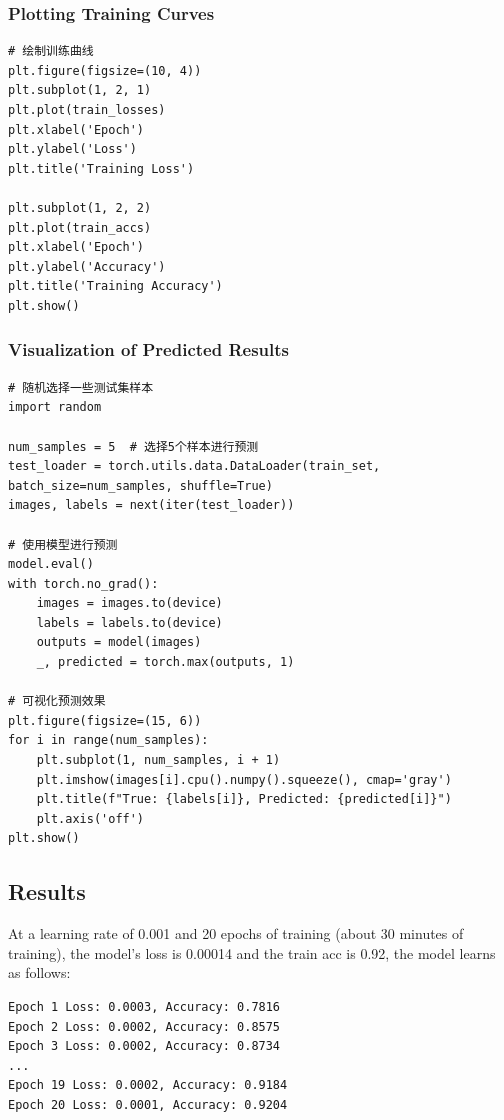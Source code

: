 \documentclass[a4paper,12pt]{article}
\begin{document}
\subsubsection{Plotting Training Curves}
\begin{lstlisting}
# 绘制训练曲线
plt.figure(figsize=(10, 4))
plt.subplot(1, 2, 1)
plt.plot(train_losses)
plt.xlabel('Epoch')
plt.ylabel('Loss')
plt.title('Training Loss')

plt.subplot(1, 2, 2)
plt.plot(train_accs)
plt.xlabel('Epoch')
plt.ylabel('Accuracy')
plt.title('Training Accuracy')
plt.show()

\end{lstlisting}

\subsubsection{Visualization of Predicted Results}
\begin{lstlisting}
# 随机选择一些测试集样本
import random

num_samples = 5  # 选择5个样本进行预测
test_loader = torch.utils.data.DataLoader(train_set, batch_size=num_samples, shuffle=True)
images, labels = next(iter(test_loader))

# 使用模型进行预测
model.eval()
with torch.no_grad():
    images = images.to(device)
    labels = labels.to(device)
    outputs = model(images)
    _, predicted = torch.max(outputs, 1)

# 可视化预测效果
plt.figure(figsize=(15, 6))
for i in range(num_samples):
    plt.subplot(1, num_samples, i + 1)
    plt.imshow(images[i].cpu().numpy().squeeze(), cmap='gray')
    plt.title(f"True: {labels[i]}, Predicted: {predicted[i]}")
    plt.axis('off')
plt.show()

\end{lstlisting}

\subsection{Results}
At a learning rate of 0.001 and 20 epochs of training (about 30 minutes of training), the model's loss
is 0.00014 and the train acc is 0.92, the model learns as follows:

\begin{lstlisting}
Epoch 1 Loss: 0.0003, Accuracy: 0.7816
Epoch 2 Loss: 0.0002, Accuracy: 0.8575
Epoch 3 Loss: 0.0002, Accuracy: 0.8734
...
Epoch 19 Loss: 0.0002, Accuracy: 0.9184
Epoch 20 Loss: 0.0001, Accuracy: 0.9204
\end{lstlisting}
\end{document}
